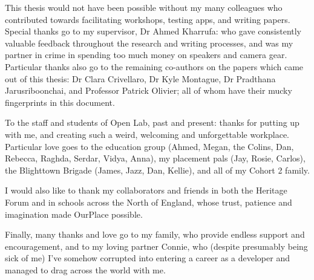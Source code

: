 
\begin{dedication} 

This thesis would not have been possible without my many colleagues who contributed towards facilitating workshops, testing apps, and writing papers. Special thanks go to my supervisor, Dr Ahmed Kharrufa: who gave consistently valuable feedback throughout the research and writing processes, and was my partner in crime in spending too much money on speakers and camera gear. Particular thanks also go to the remaining co-authors on the papers which came out of this thesis: Dr Clara Crivellaro, Dr Kyle Montague, Dr Pradthana Jarusriboonchai, and Professor Patrick Olivier; all of whom have their mucky fingerprints in this document.

To the staff and students of Open Lab, past and present: thanks for putting up with me, and creating such a weird, welcoming and unforgettable workplace. Particular love goes to the education group (Ahmed, Megan, the Colins, Dan, Rebecca, Raghda, Serdar, Vidya, Anna), my placement pals (Jay, Rosie, Carlos), the Blighttown Brigade (James, Jazz, Dan, Kellie), and all of my Cohort 2 family.

I would also like to thank my collaborators and friends in both the Heritage Forum and in schools across the North of England, whose trust, patience and imagination made OurPlace possible.

Finally, many thanks and love go to my family, who provide endless support and encouragement, and to my loving partner Connie, who (despite presumably being sick of me) I've somehow corrupted into entering a career as a developer and managed to drag across the world with me.

\end{dedication}

